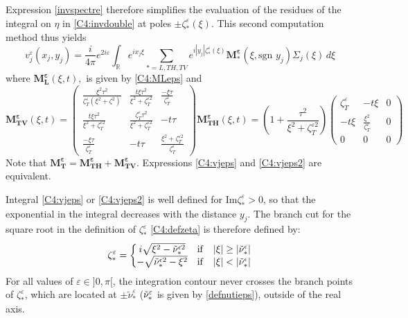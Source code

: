Expression \eqref{invspectre} therefore simplifies the evaluation of the residues of the integral on $\eta$ in \eqref{C4:invdouble} at poles $\pm \zeta^{\varepsilon}_*(\xi)$. This second computation method thus yields
\begin{equation}
v_j^{\varepsilon}(x_j,y_j)=\frac{i}{4\pi}e^{2i\varepsilon}\int_{\mathbb{R}} e^{ix_j\xi}\sum_{*=L,TH,TV}e^{i|y_j|\zeta_*^{\varepsilon}(\xi)}\mathbf{M_*^{\varepsilon}}(\xi,\mbox{sgn }y_j)\Sigma_j(\xi)\,d\xi
\label{C4:vjeps2}
\end{equation}
where $\mathbf{M_L^{\varepsilon}}(\xi,t),$ is given by \eqref{C4:MLeps} and
\begin{subequations}
\begin{equation}
\mathbf{M_{TV}^{\varepsilon}}(\xi,t)=\begin{pmatrix}
\frac{\xi^2\tau^2}{\zeta_T^{\varepsilon}(\xi^2+\zeta^2)}&\frac{t\xi\tau^2}{\xi^2+\zeta_T^{\varepsilon 2}}&\frac{-\xi\tau}{\zeta_T^{\varepsilon}}\\
\frac{t\xi\tau^2}{\xi^2+\zeta_T^{\varepsilon 2}}&\frac{\zeta_T^{\varepsilon}\tau^2}{\xi^2+\zeta_T^{\varepsilon 2}}&-t\tau\\
\frac{-\xi\tau}{\zeta_T^{\varepsilon}}&-t\tau&\frac{\xi^2+\zeta_T^{\varepsilon 2}}{\zeta_T^{\varepsilon}}
\end{pmatrix}
\label{C4:MTVeps}
\end{equation}
\begin{equation}
\mathbf{M_{TH}^{\varepsilon}}(\xi,t)=\left(1+\frac{\tau^2}{\xi^2+\zeta_T^{\varepsilon 2}}\right)\begin{pmatrix}
\zeta_T^{\varepsilon}&-t\xi&0\\
-t\xi&\frac{\xi^2}{\zeta_T^{\varepsilon}}&0\\
0&0&0
\end{pmatrix}
\label{C4:MTHeps}
\end{equation}
\label{C4:M*eps2}
\end{subequations}
Note that $ \mathbf{M_T^{\varepsilon}}=\mathbf{M_{TH}^{\varepsilon}}+\mathbf{M_{TV}^{\varepsilon}}$. Expressions \eqref{C4:vjeps} and \eqref{C4:vjeps2} are equivalent.

Integral \eqref{C4:vjeps} or \eqref{C4:vjeps2} is well defined for Im$\zeta_*^{\varepsilon}>0$, so that the exponential in the integral decreases with the distance $y_j$. The branch cut for the square root in the definition of $\zeta_*^{\varepsilon}$ \eqref{C4:defzeta} is therefore defined by:
\begin{equation}
\zeta_*^{\varepsilon}=\left\{
\begin{matrix}
i \sqrt{\xi^2-\tilde{\nu}_*^{\epsilon 2}} & \rm if & |\xi|\geq |\tilde{\nu}_*^{\epsilon}|
\\
-\sqrt{\tilde{\nu}_*^{\epsilon 2}-\xi^2} & \rm if & |\xi|< |\tilde{\nu}_*^{\epsilon}|
\end{matrix}
\right.
\label{C4:zetabranchcut}
\end{equation}
For all values of $\varepsilon \in \rbrack 0, \pi \lbrack $, the integration contour never crosses the branch points of $\zeta_*^{\varepsilon}$, which are located at $\pm \tilde{\nu}_*^{\varepsilon}$ ($\tilde{\nu}_*^{\varepsilon}$ is given by \eqref{defnutieps}), outside of the real axis.

